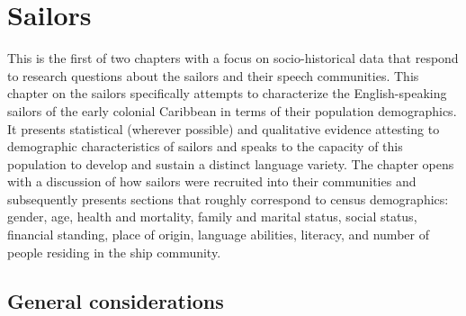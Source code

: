 \chapter{ {Sailors} }

This is the first of two chapters with a focus on socio-historical data that respond to research questions about the sailors and their speech communities. This chapter on the sailors specifically attempts to characterize the English-speaking sailors of the early colonial Caribbean in terms of their population demographics. It presents statistical (wherever possible) and qualitative evidence attesting to demographic characteristics of sailors and speaks to the capacity of this population to develop and sustain a distinct language variety. The chapter opens with a discussion of how sailors were recruited into their communities and subsequently presents sections that roughly correspond to census demographics: gender, age, health and mortality, family and marital status, social status, financial standing, place of origin, language abilities, literacy, and number of people residing in the ship community. 

\section{{General considerations}}\label{sec:3.1}

